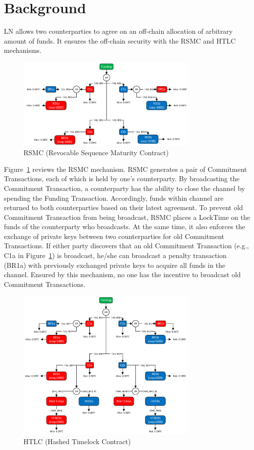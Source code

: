 \section{Background}
\label{sec:problem}

LN allows two counterparties to agree on an off-chain allocation of arbitrary amount of funds. It ensures the off-chain security with the RSMC and HTLC mechanisms.

\begin{figure}[t]
\centering
\includegraphics[width=3.5in]{figs/rsmc_old.pdf}
\vspace{-12pt}
\caption{RSMC (Revocable Sequence Maturity Contract)}
\label{fig:RSMC}
\end{figure}


Figure~\ref{fig:RSMC} reviews the RSMC mechanism. RSMC generates a pair of Commitment Transactions, each of which is held by one's counterparty. By broadcasting the Commitment Transaction, a counterparty has the ability to close the channel by spending the Funding Transaction. Accordingly, funds within channel are returned to both counterparties based on their latest agreement. To prevent old Commitment Transaction from being broadcast, RSMC places a LockTime on the funds of the counterparty who broadcasts. At the same time, it also enforces the exchange of private keys between two counterparties for old Commitment Transactions. If either party discovers that an old Commitment Transaction (e.g., C1a in Figure~\ref{fig:RSMC}) is broadcast, he/she can broadcast a penalty transaction (BR1a) with previously exchanged private keys to acquire all funds in the channel. Ensured by this mechanism, no one has the incentive to broadcast old Commitment Transactions.

\begin{figure}[t]
\centering
\includegraphics[width=3.5in]{figs/htlc_old.pdf}
\vspace{-12pt}
\caption{HTLC (Hashed Timelock Contract)}
\label{fig:htlc}
\end{figure}


